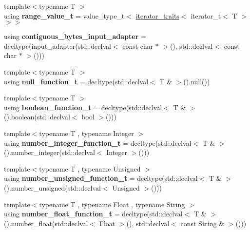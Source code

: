 \begin{DoxyCompactItemize}
{\footnotesize template$<$typename T $>$ }\\using {\bfseries range\+\_\+value\+\_\+t} = value\+\_\+type\+\_\+t$<$ \hyperlink{structnlohmann_1_1detail_1_1iterator__traits}{iterator\+\_\+traits}$<$ iterator\+\_\+t$<$ T $>$ $>$$>$
\item 
\mbox{\label{namespacenlohmann_1_1detail_abc51edd46a1d1a0ff06a19f08ceff563}} 
using {\bfseries contiguous\+\_\+bytes\+\_\+input\+\_\+adapter} = decltype(input\+\_\+adapter(std\+::declval$<$ const char $\ast$ $>$(), std\+::declval$<$ const char $\ast$ $>$()))
\item 
\mbox{\label{namespacenlohmann_1_1detail_ac1b4e524746bf8b790b2b776048b93c4}} 
{\footnotesize template$<$typename T $>$ }\\using {\bfseries null\+\_\+function\+\_\+t} = decltype(std\+::declval$<$ T \& $>$().null())
\item 
\mbox{\label{namespacenlohmann_1_1detail_a45ec87326503b8884b664a9ef23a6c99}} 
{\footnotesize template$<$typename T $>$ }\\using {\bfseries boolean\+\_\+function\+\_\+t} = decltype(std\+::declval$<$ T \& $>$().boolean(std\+::declval$<$ bool $>$()))
\item 
\mbox{\label{namespacenlohmann_1_1detail_a4a3e14a011b9ea1ff849fc6d2411e6a0}} 
{\footnotesize template$<$typename T , typename Integer $>$ }\\using {\bfseries number\+\_\+integer\+\_\+function\+\_\+t} = decltype(std\+::declval$<$ T \& $>$().number\+\_\+integer(std\+::declval$<$ Integer $>$()))
\item 
\mbox{\label{namespacenlohmann_1_1detail_a74da7b17bda76f65d276feb18209c913}} 
{\footnotesize template$<$typename T , typename Unsigned $>$ }\\using {\bfseries number\+\_\+unsigned\+\_\+function\+\_\+t} = decltype(std\+::declval$<$ T \& $>$().number\+\_\+unsigned(std\+::declval$<$ Unsigned $>$()))
\item 
\mbox{\label{namespacenlohmann_1_1detail_ad42df56e913abe26ed556e0e92f386f4}} 
{\footnotesize template$<$typename T , typename Float , typename String $>$ }\\using {\bfseries number\+\_\+float\+\_\+function\+\_\+t} = decltype(std\+::declval$<$ T \& $>$().number\+\_\+float(std\+::declval$<$ Float $>$(), std\+::declval$<$ const String \& $>$()))
$$
\end{DoxyCompactItemize}
